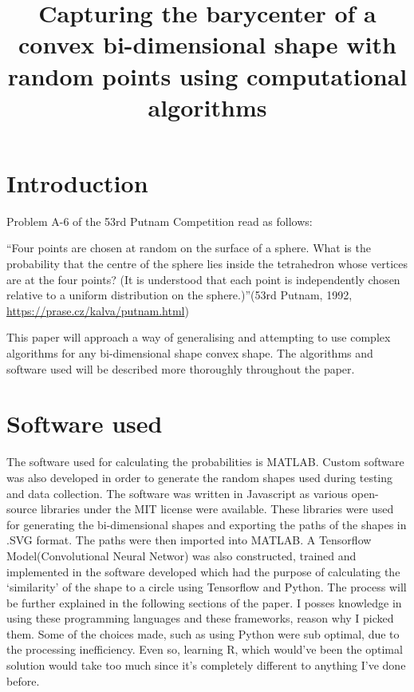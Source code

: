 \documentclass[9pt,onecolumn,oneside]{osajnl}
\title{Capturing the barycenter of a convex bi-dimensional shape with random points using computational algorithms}
\affil[1]{Mathematics EE, Sevenoaks School, High St, Sevenoaks TN13 1HU, United Kingdom}
\affil[*]{Corresponding author: teodor@calin.ro}
\begin{document}
\maketitle



\section{Introduction}

Problem A-6 of the 53rd Putnam Competition read as follows:

	“Four points are chosen at random on the surface of a sphere. What is the probability that the centre of the sphere lies inside the tetrahedron whose vertices are at the four points? (It is understood that each point is independently chosen relative to a uniform distribution on the sphere.)”(53rd Putnam, 1992, \url{https://prase.cz/kalva/putnam.html})
    
    This paper will approach a way of generalising and attempting to use complex algorithms for any bi-dimensional shape convex shape. The algorithms and software used will be described more thoroughly throughout the paper.


\section{Software used}

	The software used for calculating the probabilities is MATLAB. Custom software was also developed in order to generate the random shapes used during testing and data collection. The software was written in Javascript as various open-source libraries under the MIT license were available. These libraries were used for generating the bi-dimensional shapes and exporting the paths of the shapes in .SVG format. The paths were then imported into MATLAB. A Tensorflow Model(Convolutional Neural Networ) was also constructed, trained and implemented in the software developed which had the purpose of calculating the ‘similarity’ of the shape to a circle using Tensorflow and Python. The process will be further explained in the following sections of the paper.
    I posses knowledge in using these programming languages and these frameworks, reason why I picked them. Some of the choices made, such as using Python were sub optimal, due to the processing inefficiency. Even so, learning R, which would've been the optimal solution would take too much since it's completely different to anything I've done before.
 
\end{document}
